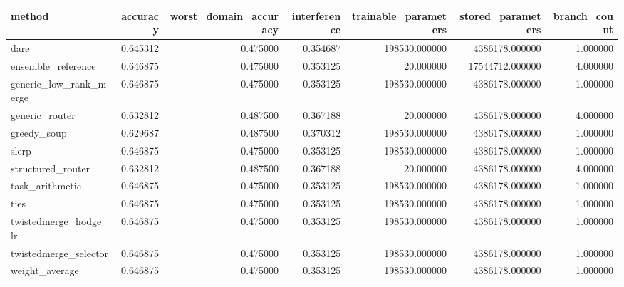 \begin{tabular}{lrrrrrr}
\toprule
method & accuracy & worst_domain_accuracy & interference & trainable_parameters & stored_parameters & branch_count \\
\midrule
dare & 0.645312 & 0.475000 & 0.354687 & 198530.000000 & 4386178.000000 & 1.000000 \\
ensemble_reference & 0.646875 & 0.475000 & 0.353125 & 20.000000 & 17544712.000000 & 4.000000 \\
generic_low_rank_merge & 0.646875 & 0.475000 & 0.353125 & 198530.000000 & 4386178.000000 & 1.000000 \\
generic_router & 0.632812 & 0.487500 & 0.367188 & 20.000000 & 4386178.000000 & 4.000000 \\
greedy_soup & 0.629687 & 0.487500 & 0.370312 & 198530.000000 & 4386178.000000 & 1.000000 \\
slerp & 0.646875 & 0.475000 & 0.353125 & 198530.000000 & 4386178.000000 & 1.000000 \\
structured_router & 0.632812 & 0.487500 & 0.367188 & 20.000000 & 4386178.000000 & 4.000000 \\
task_arithmetic & 0.646875 & 0.475000 & 0.353125 & 198530.000000 & 4386178.000000 & 1.000000 \\
ties & 0.646875 & 0.475000 & 0.353125 & 198530.000000 & 4386178.000000 & 1.000000 \\
twistedmerge_hodge_lr & 0.646875 & 0.475000 & 0.353125 & 198530.000000 & 4386178.000000 & 1.000000 \\
twistedmerge_selector & 0.646875 & 0.475000 & 0.353125 & 198530.000000 & 4386178.000000 & 1.000000 \\
weight_average & 0.646875 & 0.475000 & 0.353125 & 198530.000000 & 4386178.000000 & 1.000000 \\
\bottomrule
\end{tabular}

